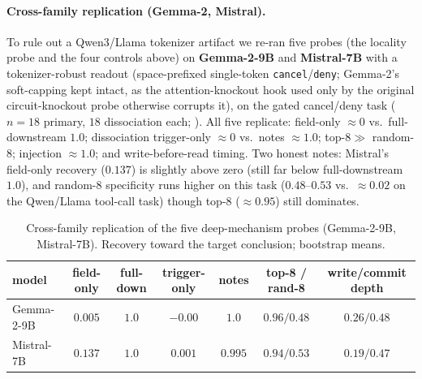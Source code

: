 \paragraph{Cross-family replication (Gemma-2, Mistral).} To rule out a Qwen3/Llama tokenizer artifact
we re-ran five probes (the locality probe and the four controls above) on \textbf{Gemma-2-9B} and
\textbf{Mistral-7B} with a tokenizer-robust readout
(space-prefixed single-token \texttt{cancel}/\texttt{deny}; Gemma-2's soft-capping kept intact, as the
attention-knockout hook used only by the original circuit-knockout probe otherwise corrupts it), on the
gated cancel/deny task ($n{=}18$ primary, $18$ dissociation each; ). All five replicate:
field-only $\approx0$ vs.\ full-downstream $1.0$; dissociation trigger-only $\approx0$ vs.\ notes
$\approx1.0$; top-$8 \gg$ random-$8$; injection $\approx1.0$; and write-before-read timing. Two honest
notes: Mistral's field-only recovery ($0.137$) is slightly above zero (still far below full-downstream
$1.0$), and random-$8$ specificity runs higher on this task ($0.48$--$0.53$ vs.\ ${\approx}0.02$ on the
Qwen/Llama tool-call task) though top-$8$ ($\approx0.95$) still dominates.

\begin{table}[tbp]
\centering\small
\caption{Cross-family replication of the five deep-mechanism probes (Gemma-2-9B, Mistral-7B).
Recovery toward the target conclusion; bootstrap means.}
\label{tab:xfamily}
\begin{tabular}{@{}lcccccc@{}}
\toprule
model & field-only & full-down & trigger-only & notes & top-8 / rand-8 & write/commit depth \\
\midrule
Gemma-2-9B  & $0.005$ & $1.0$ & $-0.00$ & $1.0$   & $0.96 / 0.48$ & $0.26 / 0.48$ \\
Mistral-7B  & $0.137$ & $1.0$ & $0.001$ & $0.995$ & $0.94 / 0.53$ & $0.19 / 0.47$ \\
\bottomrule
\end{tabular}
\end{table}

